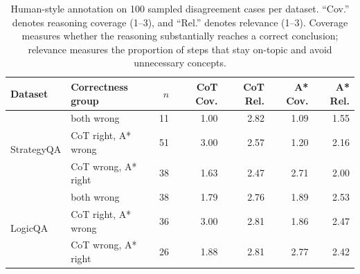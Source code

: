 \documentclass{article}
\begin{document}
\begin{table}[t]
\centering
\small
\begin{tabular}{llrrrrr}
\toprule
Dataset & Correctness group & $n$ & CoT Cov. & CoT Rel. & A* Cov. & A* Rel. \\
\midrule
\multirow{3}{*}{StrategyQA}
& both wrong            & 11 & 1.00 & 2.82 & 1.09 & 1.55 \\
& CoT right, A* wrong   & 51 & 3.00 & 2.57 & 1.20 & 2.16 \\
& CoT wrong, A* right   & 38 & 1.63 & 2.47 & 2.71 & 2.00 \\
\midrule
\multirow{3}{*}{LogicQA}
& both wrong            & 38 & 1.79 & 2.76 & 1.89 & 2.53 \\
& CoT right, A* wrong   & 36 & 3.00 & 2.81 & 1.86 & 2.47 \\
& CoT wrong, A* right   & 26 & 1.88 & 2.81 & 2.77 & 2.42 \\
\bottomrule
\end{tabular}
\caption{Human-style annotation on 100 sampled disagreement cases per dataset. “Cov.” denotes reasoning coverage (1--3), and “Rel.” denotes relevance (1--3). Coverage measures whether the reasoning substantially reaches a correct conclusion; relevance measures the proportion of steps that stay on-topic and avoid unnecessary concepts.}
\label{tab:disagreement-human-eval}
\end{table}






\end{document}
